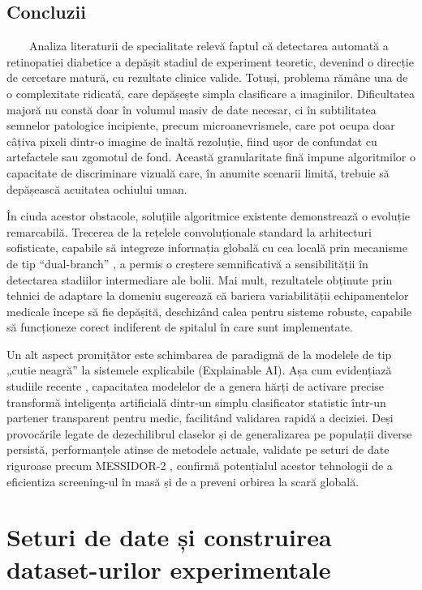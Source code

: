 \documentclass[12pt, a4paper, twoside, romanian]{teza-upb}
\begin{document}
\section{Concluzii}

\ \ \ \ Analiza literaturii de specialitate relevă faptul că detectarea automată a retinopatiei diabetice
a
depășit stadiul de experiment teoretic, devenind o direcție de cercetare matură, cu rezultate clinice
valide. Totuși, problema rămâne una de o complexitate ridicată, care depășește simpla clasificare a
imaginilor. Dificultatea majoră nu constă doar în volumul masiv de date necesar, ci în subtilitatea
semnelor patologice incipiente, precum microanevrismele, care pot ocupa doar câțiva pixeli dintr-o
imagine de înaltă rezoluție, fiind ușor de confundat cu artefactele sau zgomotul de fond. Această
granularitate fină impune algoritmilor o capacitate de discriminare vizuală care, în anumite scenarii
limită, trebuie să depășească acuitatea ochiului uman.
\bigskip

În ciuda acestor obstacole, soluțiile algoritmice existente demonstrează o evoluție remarcabilă.
Trecerea de la rețelele convoluționale standard la arhitecturi sofisticate, capabile să integreze informația
globală cu cea locală prin mecanisme de tip “dual-branch” \cite{11_shakibania2024dual}, a permis o creștere semnificativă a
sensibilității în detectarea stadiilor intermediare ale bolii. Mai mult, rezultatele obținute prin tehnici de
adaptare la domeniu \cite{8_zhang2022multi} sugerează că bariera variabilității echipamentelor medicale începe să fie
depășită, deschizând calea pentru sisteme robuste, capabile să funcționeze corect indiferent de spitalul
în care sunt implementate.
\bigskip

Un alt aspect promițător este schimbarea de paradigmă de la modelele de tip „cutie neagră” la
sistemele explicabile (Explainable AI). Așa cum evidențiază studiile recente \cite{9_chetoui2020explainable}, capacitatea modelelor de
a genera hărți de activare precise transformă inteligența artificială dintr-un simplu clasificator statistic
într-un partener transparent pentru medic, facilitând validarea rapidă a deciziei. Deși provocările legate
de dezechilibrul claselor și de generalizarea pe populații diverse persistă, performanțele atinse de
metodele actuale, validate pe seturi de date riguroase precum MESSIDOR-2 \cite{9_chetoui2020explainable}, confirmă potențialul
acestor tehnologii de a eficientiza screening-ul în masă și de a preveni orbirea la scară globală.


\chapter{Seturi de date și construirea dataset-urilor experimentale}
\end{document}
